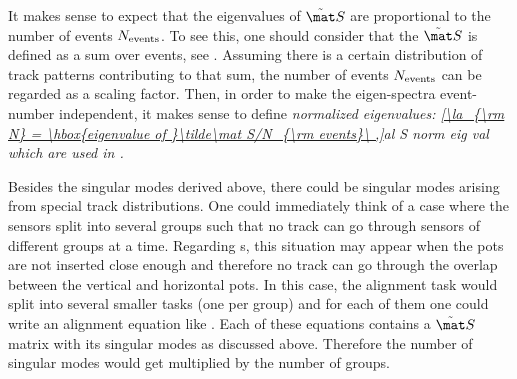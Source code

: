 It makes sense to expect that the eigenvalues of $\tilde\mat S$ are proportional to the number of events $N_{\rm events}$. To see this, one should consider that the $\tilde\mat S$ is defined as a sum over events, see . Assuming there is a certain distribution of track patterns contributing to that sum, the number of events $N_{\rm events}$ can be regarded as a scaling factor. Then, in order to make the eigen-spectra event-number independent, it makes sense to define \em{normalized eigenvalues}:
\eqref{\la_{\rm N} = \hbox{eigenvalue of }\tilde\mat S/N_{\rm events}\ ,}{al S norm eig val}
which are used in .




Besides the singular modes derived above, there could be singular modes arising from special track distributions. One could immediately think of a case where the sensors split into several groups such that no track can go through sensors of different groups at a time. Regarding s, this situation may appear when the pots are not inserted close enough and therefore no track can go through the overlap between the vertical and horizontal pots. In this case, the alignment task would split into several smaller tasks (one per group) and for each of them one could write an alignment equation like . Each of these equations contains a $\tilde\mat S$ matrix with its singular modes as discussed above. Therefore the number of singular modes would get multiplied by the number of groups.

